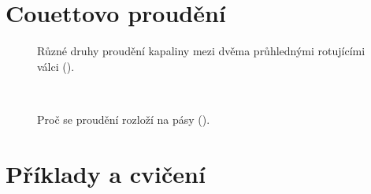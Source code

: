   \section{Couettovo proudění}\label{fyz:IIchapXLIsecVI}

    \begin{figure}[hb!] %
      \centering
      \caption{Různé druhy proudění kapaliny mezi dvěma průhlednými rotujícími válci
               (\cite[s.~770]{Feynman02}).}
      \label{fyz:fig0542}
    \end{figure}
  
    \begin{figure}[hb!] %
      \centering
        \\
      \caption{Proč se proudění rozloží na pásy
               (\cite[s.~770]{Feynman02}).}
      \label{fyz:fig0543}
    \end{figure}

  \section{Příklady a cvičení}\label{fyz:IIchapXLIsecVII}



